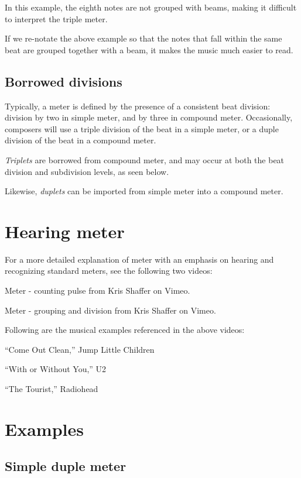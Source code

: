 \documentclass{book}
\begin{document}
In this example, the eighth notes are not grouped with beams, making it
difficult to interpret the triple meter.

If we re-notate the above example so that the notes that fall within the same
beat are grouped together with a beam, it makes the music much easier to read.

\hypertarget{borrowed-divisions}{%
\subsection{Borrowed divisions}\label{borrowed-divisions}}

Typically, a meter is defined by the presence of a consistent beat division:
division by two in simple meter, and by three in compound meter. Occasionally,
composers will use a triple division of the beat in a simple meter, or a duple
division of the beat in a compound meter.

\emph{Triplets} are borrowed from compound meter, and may occur at both the
beat division and subdivision levels, as seen below.

Likewise, \emph{duplets} can be imported from simple meter into a compound
meter.

\hypertarget{hearing-meter}{%
\section{Hearing meter}\label{hearing-meter}}

For a more detailed explanation of meter with an emphasis on hearing and
recognizing standard meters, see the following two videos:

Meter - counting pulse from Kris Shaffer on Vimeo.

Meter - grouping and division from Kris Shaffer on Vimeo.

Following are the musical examples referenced in the above videos:

``Come Out Clean,'' Jump Little Children

``With or Without You,'' U2

``The Tourist,'' Radiohead

\hypertarget{examples}{%
\section{Examples}\label{examples}}

\hypertarget{simple-duple-meter}{%
\subsection{Simple duple meter}\label{simple-duple-meter}}
\end{document}
